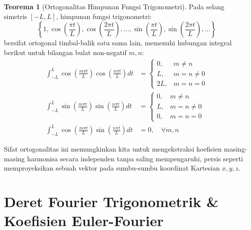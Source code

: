 \documentclass[11pt,a4paper]{article}
\theoremstyle{definition}
\newtheorem{theorem}{Teorema}[section]
\begin{document}
\begin{theorem}[Ortogonalitas Himpunan Fungsi Trigonometri]
Pada selang simetris $[-L, L]$, himpunan fungsi trigonometri:
\begin{equation*}
    \left\{ 1, \cos\left(\frac{\pi t}{L}\right), \cos\left(\frac{2\pi t}{L}\right), \dots, \sin\left(\frac{\pi t}{L}\right), \sin\left(\frac{2\pi t}{L}\right), \dots \right\}
\end{equation*}
bersifat ortogonal timbal-balik satu sama lain, memenuhi hubungan integral berikut untuk bilangan bulat non-negatif $m, n$:
\begin{align}
    \int_{-L}^{L} \cos\left(\frac{m\pi t}{L}\right) \cos\left(\frac{n\pi t}{L}\right) dt &= \begin{cases} 0, & m \ne n \\ L, & m = n \ne 0 \\ 2L, & m = n = 0 \end{cases} \label{eq:ortho_cos} \\
    \int_{-L}^{L} \sin\left(\frac{m\pi t}{L}\right) \sin\left(\frac{n\pi t}{L}\right) dt &= \begin{cases} 0, & m \ne n \\ L, & m = n \ne 0 \\ 0, & m = n = 0 \end{cases} \label{eq:ortho_sin} \\
    \int_{-L}^{L} \cos\left(\frac{m\pi t}{L}\right) \sin\left(\frac{n\pi t}{L}\right) dt &= 0, \quad \forall m, n \label{eq:ortho_cossin}
\end{align}
\end{theorem}

Sifat ortogonalitas ini memungkinkan kita untuk mengekstraksi koefisien masing-masing harmonisa secara independen tanpa saling mempengaruhi, persis seperti memproyeksikan sebuah vektor pada sumbu-sumbu koordinat Kartesian $x, y, z$.

\section{Deret Fourier Trigonometrik \& Koefisien Euler-Fourier}
\end{document}
